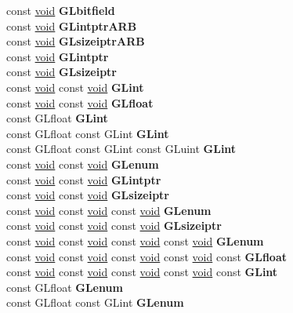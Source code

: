\begin{DoxyCompactItemize}
\begin{tabbing}
\>const \hyperlink{interfacevoid}{void} {\bfseries GLbitfield}\\
\>const \hyperlink{interfacevoid}{void} {\bfseries GLintptrARB}\\
\>const \hyperlink{interfacevoid}{void} {\bfseries GLsizeiptrARB}\\
\>const \hyperlink{interfacevoid}{void} {\bfseries GLintptr}\\
\>const \hyperlink{interfacevoid}{void} {\bfseries GLsizeiptr}\\
\>const \hyperlink{interfacevoid}{void} const \hyperlink{interfacevoid}{void} {\bfseries GLint}\\
\>const \hyperlink{interfacevoid}{void} const \hyperlink{interfacevoid}{void} {\bfseries GLfloat}\\
\>const GLfloat {\bfseries GLint}\\
\>const GLfloat const GLint {\bfseries GLint}\\
\>const GLfloat const GLint const GLuint {\bfseries GLint}\\
\>const \hyperlink{interfacevoid}{void} const \hyperlink{interfacevoid}{void} {\bfseries GLenum}\\
\>const \hyperlink{interfacevoid}{void} const \hyperlink{interfacevoid}{void} {\bfseries GLintptr}\\
\>const \hyperlink{interfacevoid}{void} const \hyperlink{interfacevoid}{void} {\bfseries GLsizeiptr}\\
\>const \hyperlink{interfacevoid}{void} const \hyperlink{interfacevoid}{void} const \hyperlink{interfacevoid}{void} {\bfseries GLenum}\\
\>const \hyperlink{interfacevoid}{void} const \hyperlink{interfacevoid}{void} const \hyperlink{interfacevoid}{void} {\bfseries GLsizeiptr}\\
\>const \hyperlink{interfacevoid}{void} const \hyperlink{interfacevoid}{void} const \hyperlink{interfacevoid}{void} const \hyperlink{interfacevoid}{void} {\bfseries GLenum}\\
\>const \hyperlink{interfacevoid}{void} const \hyperlink{interfacevoid}{void} const \hyperlink{interfacevoid}{void} const \hyperlink{interfacevoid}{void} const {\bfseries GLfloat}\\
\>const \hyperlink{interfacevoid}{void} const \hyperlink{interfacevoid}{void} const \hyperlink{interfacevoid}{void} const \hyperlink{interfacevoid}{void} const {\bfseries GLint}\\
\>const GLfloat {\bfseries GLenum}\\
\>const GLfloat const GLint {\bfseries GLenum}\\

\end{tabbing}
\end{DoxyCompactItemize}
